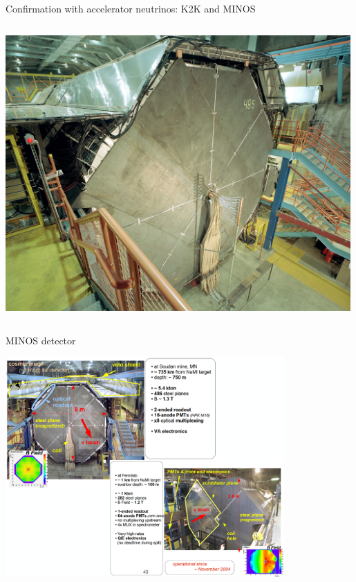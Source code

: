 \begin{frame}[t]{Confirmation with accelerator neutrinos: K2K and MINOS}
\begin{columns}
  \begin{column}{0.30\textwidth}
    \includegraphics[width=0.99\textwidth]{./images/3nu/accelerator/minos_far_det.png}
  \end{column}
\end{columns}
\end{frame}


\begin{frame}[t]{MINOS detector}
  \begin{center}
  \includegraphics[width=0.80\textwidth]{./images/3nu/accelerator/minos_detector_01.png}\\
  \end{center}
\end{frame}

